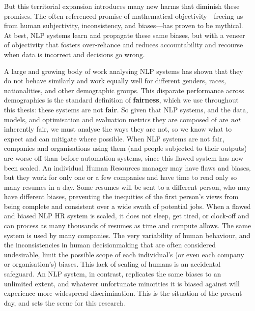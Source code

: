 But this territorial expansion introduces many new harms that diminish these promises.  
The often referenced promise of mathematical objectivity---freeing us from human subjectivity, inconsistency, and biases---has proven to be mythical. 
At best, NLP systems learn and propagate these same biases, but with a veneer of objectivity that fosters over-reliance \citep{oneil2016weapons} and reduces accountability and recourse when data is incorrect and decisions go wrong. 

A large and growing body of work analysing NLP systems has shown that they do not behave similarly and work equally well for different genders, races, nationalities, and other demographic groups. This disparate performance across demographics is the standard definition of \textbf{fairness}, which we use throughout this thesis: these systems are not \textbf{fair}. 
So given that NLP systems, and the data, models, and optimisation and evaluation metrics they are composed of are \textit{not} inherently fair, we must analyse the ways they are not, so we know what to expect and can mitigate where possible. When NLP systems are not fair, companies and organisations using them (and people subjected to their outputs) are worse off than before automation systems, since this flawed system has now been scaled. An individual Human Resources manager may have flaws and biases, but they work for only one or a few companies and have time to read only so many resumes in a day. Some resumes will be sent to a different person, who may have different biases, preventing the inequities of the first person's views from being complete and consistent over a wide swath of potential jobs. When a flawed and biased NLP HR system is scaled, it does not sleep, get tired, or clock-off and can process as many thousands of resumes as time and compute allows. The same system is used by many companies. The very variability of human behaviour, and the inconsistencies in human decisionmaking that are often considered undesirable, limit the possible scope of each individual's (or even each company or organisation's) biases. This lack of scaling of humans is an accidental safeguard. An NLP system, in contrast, replicates the same biases to an unlimited extent, and whatever unfortunate minorities it is biased against will experience more widespread discrimination. This is the situation of the present day, and sets the scene for this research.

